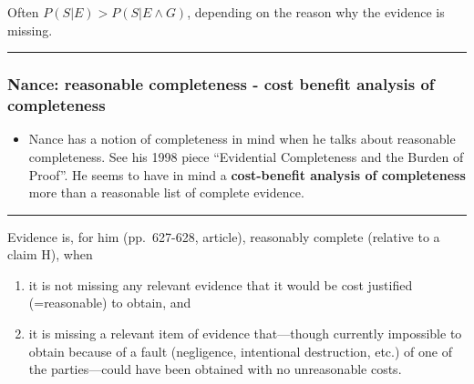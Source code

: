 \documentclass[
  10pt,
  dvipsnames,enabledeprecatedfontcommands]{scrartcl}
\providecommand{\tightlist}{%
  \setlength{\itemsep}{0pt}\setlength{\parskip}{0pt}}
\begin{document}
Often \(P(S \vert E) > P(S \vert E \wedge G)\), depending on the reason
why the evidence is missing.



\begin{center}\rule{0.5\linewidth}{0.5pt}\end{center}

\hypertarget{nance-reasonable-completeness---cost-benefit-analysis-of-completeness}{%
\subsubsection{Nance: reasonable completeness - cost benefit analysis of
completeness}\label{nance-reasonable-completeness---cost-benefit-analysis-of-completeness}}

\begin{itemize}
\tightlist
\item
  Nance has a notion of completeness in mind when he talks about
  reasonable completeness. See his 1998 piece ``Evidential Completeness
  and the Burden of Proof''. He seems to have in mind a
  \textbf{cost-benefit analysis of completeness} more than a reasonable
  list of complete evidence.
\end{itemize}

\begin{center}\rule{0.5\linewidth}{0.5pt}\end{center}

Evidence is, for him (pp.~627-628, article), reasonably complete
(relative to a claim H), when

\begin{enumerate}
\def\labelenumi{(\alph{enumi})}
\item
  it is not missing any relevant evidence that it would be cost
  justified (=reasonable) to obtain, and
\item
  it is missing a relevant item of evidence that---though currently
  impossible to obtain because of a fault (negligence, intentional
  destruction, etc.) of one of the parties---could have been obtained
  with no unreasonable costs.
\end{enumerate}
\end{document}
